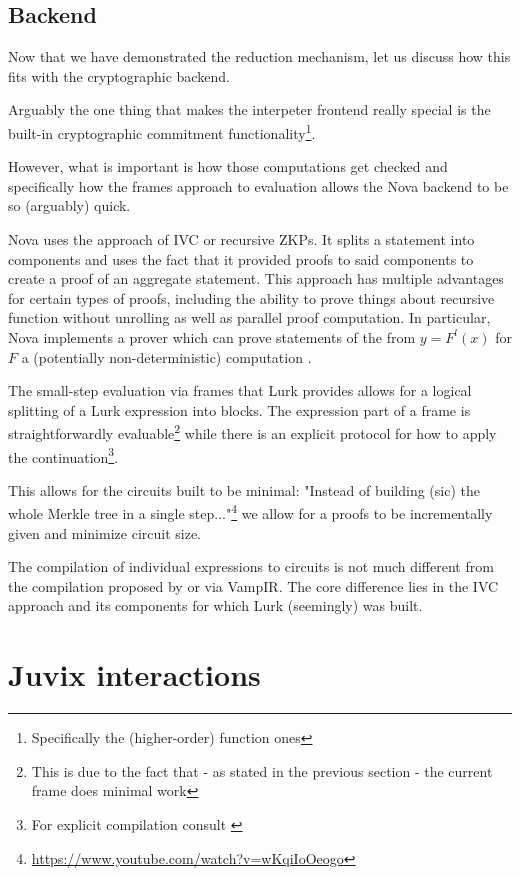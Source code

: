 \documentclass[
    9pt,            %
    techreport,        %
    affiltop,       %
]{art}
\begin{document}
\subsection{Backend}
Now that we have demonstrated the reduction mechanism, let us discuss how this fits with the cryptographic backend.

Arguably the one thing that makes the interpeter frontend really special is the built-in cryptographic commitment functionality\footnote{Specifically the (higher-order) function ones}.

However, what is important is how those computations get checked and specifically how the frames approach to evaluation allows the Nova backend to be so (arguably) quick.

Nova uses the approach of IVC or recursive ZKPs. It splits a statement into components and uses the fact that it provided proofs to said components to create a proof of an aggregate statement. This approach has multiple advantages for certain types of proofs, including the ability to prove things about recursive function without unrolling as well as parallel proof computation. In particular, Nova implements a prover which can prove statements of the from $y = F^l(x)$ for $F$ a (potentially non-deterministic) computation \cite{Nova}.

The small-step evaluation via frames that Lurk provides allows for a logical splitting of a Lurk expression into blocks. The expression part of a frame is straightforwardly evaluable\footnote{This is due to the fact that - as stated in the previous section - the current frame does minimal work} while there is an explicit protocol for how to apply the continuation\footnote{For explicit compilation consult \cite{Lurk-spec}}. 

This allows for the circuits built to be minimal: "Instead of building (sic) the whole Merkle tree in a single step..."\footnote{\url{https://www.youtube.com/watch?v=wKqiIoOeogo}} we allow for a proofs to be incrementally given and minimize circuit size.

The compilation of individual expressions to circuits is not much different from the compilation proposed by \cite{geb-pipeline} or \cite{juvix-to-vampir} via VampIR. The core difference lies in the IVC approach and its components for which Lurk (seemingly) was built. 

\section{Juvix interactions}
\end{document}
